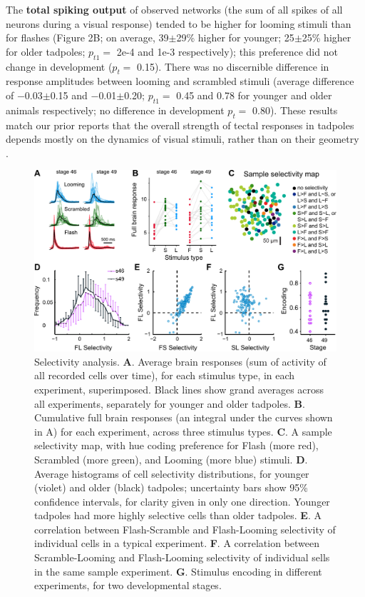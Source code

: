 \documentclass{article}
\begin{document}
The \textbf{total spiking output} of observed networks (the sum of all spikes of all neurons during a visual response) tended to be higher for looming stimuli than for flashes (Figure 2B; on average, 39$\pm$29\% higher for younger; 25$\pm$25\% higher for older tadpoles; $p_{t1}=$ 2e-4 and 1e-3 respectively); this preference did not change in development ($p_t=$ 0.15). There was no discernible difference in response amplitudes between looming and scrambled stimuli (average difference of $-$0.03$\pm$0.15 and $-$0.01$\pm$0.20; $p_{t1}=$ 0.45 and 0.78 for younger and older animals respectively; no difference in development $p_t=$ 0.80). These results match our prior reports that the overall strength of tectal responses in tadpoles depends mostly on the dynamics of visual stimuli, rather than on their geometry \citep{khakhalin2014, jang2016}.

\begin{figure}[t!]
\includegraphics[width=\linewidth]{fig2.pdf}
\caption{
Selectivity analysis. \textbf{A}. Average brain responses (sum of activity of all recorded cells over time), for each stimulus type, in each experiment, superimposed. Black lines show grand averages across all experiments, separately for younger and older tadpoles. \textbf{B}. Cumulative full brain responses (an integral under the curves shown in A) for each experiment, across three stimulus types. \textbf{C}. A sample selectivity map, with hue coding preference for Flash (more red), Scrambled (more green), and Looming (more blue) stimuli. \textbf{D}. Average histograms of cell selectivity distributions, for younger (violet) and older (black) tadpoles; uncertainty bars show 95\% confidence intervals, for clarity given in only one direction. Younger tadpoles had more highly selective cells than older tadpoles. \textbf{E}. A correlation between Flash-Scramble and Flash-Looming selectivity of individual cells in a typical experiment. \textbf{F}. A correlation between Scramble-Looming and Flash-Looming selectivity of individual sells in the same sample experiment. \textbf{G}. Stimulus encoding in different experiments, for two developmental stages.}
\end{figure}
\end{document}
